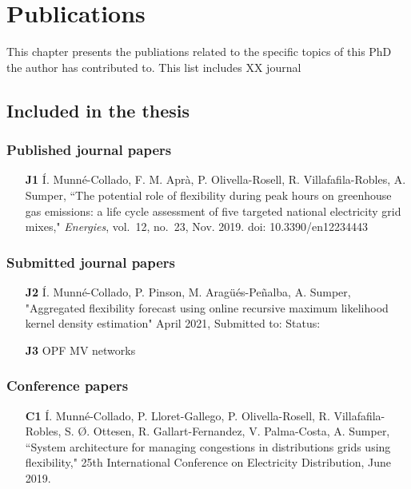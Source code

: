 \chapter{Publications}
This chapter presents the publiations related to the specific topics of this PhD the author has contributed to. This list includes XX journal 

\section*{Included in the thesis}
\subsection*{Published journal papers}

\begin{itemize}
	
	\item[\textbf{J1}] \'{I}. Munn\'{e}-Collado, F. M. Apr\`{a}, P. Olivella-Rosell, R. Villafafila-Robles, A. Sumper, ``The potential role of flexibility during peak hours on greenhouse gas emissions: a life cycle assessment of five targeted national electricity grid mixes," \textit{Energies}, vol.~12, no.~23, Nov. 2019. doi: 10.3390/en12234443
	
\end{itemize}

\subsection*{Submitted journal papers}
\begin{itemize}
	\item [\textbf{J2}] \'{I}. Munn\'{e}-Collado, P. Pinson, M. Arag\"{u}\'{e}s-Pe\~{n}alba, A. Sumper, "Aggregated flexibility forecast using online recursive maximum likelihood kernel density estimation" April 2021, Submitted to:  Status:
	\item [\textbf{J3}] OPF MV networks 
\end{itemize}

\subsection*{Conference papers}

\begin{itemize}
	\item[\textbf{C1}] \'{I}. Munn\'{e}-Collado, P. Lloret-Gallego, P. Olivella-Rosell, R. Villafafila-Robles, S. \O{}. Ottesen, R. Gallart-Fernandez, V. Palma-Costa, A. Sumper, ``System architecture for managing congestions in distributions grids using flexibility," 25th International Conference on Electricity Distribution, June 2019.
\end{itemize}

